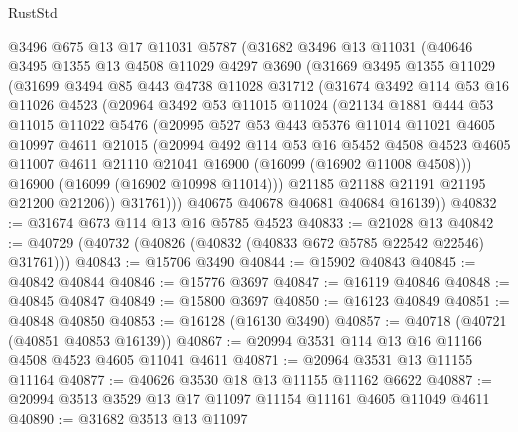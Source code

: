 \begin{lexlean}{RustStd}
\begin{coremodule}
    @3496
    @675
    @13
    @17
    @11031
    @5787
    (@31682
      @3496
      @13
      @11031
      (@40646
        @3495
        @1355
        @13
        @4508
        @11029
        @4297
        @3690
        (@31669
          @3495
          @1355
          @11029
          (@31699
            @3494
            @85
            @443
            @4738
            @11028
            @31712
            (@31674
              @3492
              @114
              @53
              @16
              @11026
              @4523
              (@20964
                @3492
                @53
                @11015
                @11024
                (@21134
                  @1881
                  @444
                  @53
                  @11015
                  @11022
                  @5476
                  (@20995
                    @527
                    @53
                    @443
                    @5376
                    @11014
                    @11021
                    @4605
                    @10997
                    @4611
                    @21015
                    (@20994
                      @492
                      @114
                      @53
                      @16
                      @5452
                      @4508
                      @4523
                      @4605
                      @11007
                      @4611
                      @21110
                      @21041
                      @16900
                      (@16099 (@16902 @11008 @4508)))
                    @16900
                    (@16099 (@16902 @10998 @11014)))
                  @21185
                  @21188
                  @21191
                  @21195
                  @21200
                  @21206))
              @31761)))
        @40675
        @40678
        @40681
        @40684
        @16139))
@40832 := @31674 @673 @114 @13 @16 @5785 @4523
@40833 := @21028 @13
@40842 := @40729 (@40732 (@40826 (@40832 (@40833 @672 @5785 @22542 @22546) @31761)))
@40843 := @15706 @3490
@40844 := @15902 @40843
@40845 := @40842 @40844
@40846 := @15776 @3697
@40847 := @16119 @40846
@40848 := @40845 @40847
@40849 := @15800 @3697
@40850 := @16123 @40849
@40851 := @40848 @40850
@40853 := @16128 (@16130 @3490)
@40857 := @40718 (@40721 (@40851 @40853 @16139))
@40867 := @20994 @3531 @114 @13 @16 @11166 @4508 @4523 @4605 @11041 @4611
@40871 := @20964 @3531 @13 @11155 @11164
@40877 := @40626 @3530 @18 @13 @11155 @11162 @6622
@40887 := @20994 @3513 @3529 @13 @17 @11097 @11154 @11161 @4605 @11049 @4611
@40890 := @31682 @3513 @13 @11097

\end{coremodule}
\end{lexlean}
